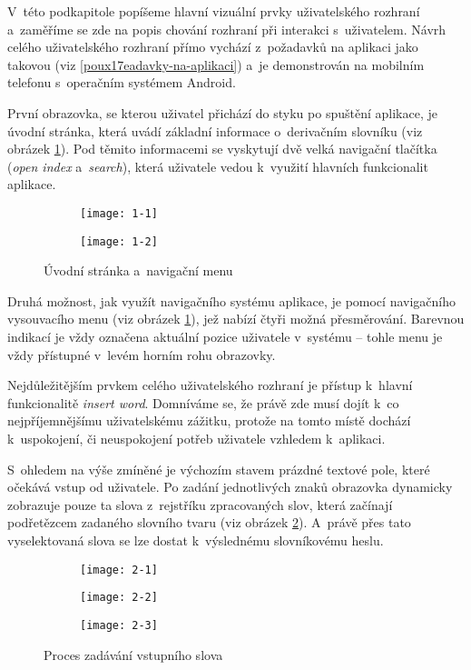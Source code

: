 V~této podkapitole popíšeme hlavní vizuální prvky uživatelského rozhraní
a~zaměříme se zde na popis chování rozhraní při interakci s~uživatelem.
Návrh celého uživatelského rozhraní přímo vychází z~požadavků na
aplikaci jako takovou (viz \ref{poux17eadavky-na-aplikaci}) a~je
demonstrován na mobilním telefonu s~operačním systémem Android.

První obrazovka, se kterou uživatel přichází do styku po spuštění
aplikace, je úvodní stránka, která uvádí základní informace o~derivačním
slovníku (viz obrázek \ref{1}). Pod těmito informacemi se vyskytují dvě
velká navigační tlačítka (\emph{open index} a~\emph{search}), která
uživatele vedou k~využití hlavních funkcionalit aplikace.

\begin{figure}[ht]
  \begin{subfigure}[b]{0.45\textwidth}
    \texttt{[image: 1-1]}
  \end{subfigure}
  \hfill
  \begin{subfigure}[b]{0.45\textwidth}
    \texttt{[image: 1-2]}
  \end{subfigure}
  \caption{Úvodní stránka a~navigační menu}
  \label{1}
\end{figure}

Druhá možnost, jak využít navigačního systému aplikace, je pomocí
navigačního vysouvacího menu (viz obrázek \ref{1}), jež nabízí čtyři
možná přesměrování. Barevnou indikací je vždy označena aktuální pozice
uživatele v~systému -- tohle menu je vždy přístupné v~levém horním rohu
obrazovky.

Nejdůležitějším prvkem celého uživatelského rozhraní je přístup k~hlavní
funkcionalitě \emph{insert word}. Domníváme se, že právě zde musí dojít
k~co nejpříjemnějšímu uživatelskému zážitku, protože na tomto místě
dochází k~uspokojení, či neuspokojení potřeb uživatele vzhledem
k~aplikaci.

S~ohledem na výše zmíněné je výchozím stavem prázdné textové pole, které
očekává vstup od uživatele. Po zadání jednotlivých znaků obrazovka
dynamicky zobrazuje pouze ta slova z~rejstříku zpracovaných slov, která
začínají podřetězcem zadaného slovního tvaru (viz obrázek \ref{2}).
A~právě přes tato vyselektovaná slova se lze dostat k~výslednému
slovníkovému heslu.

\begin{figure}[ht]
  \begin{subfigure}[b]{0.3\textwidth}
    \texttt{[image: 2-1]}
  \end{subfigure}
  \hfill
  \begin{subfigure}[b]{0.3\textwidth}
    \texttt{[image: 2-2]}
  \end{subfigure}
   \hfill
  \begin{subfigure}[b]{0.3\textwidth}
   \texttt{[image: 2-3]}
  \end{subfigure}
  \caption{Proces zadávání vstupního slova}
  \label{2}
\end{figure}

